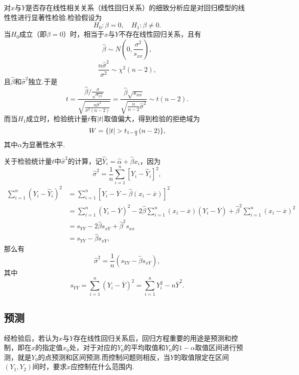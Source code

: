 对\(x\)与\(Y\)是否存在线性相关关系（线性回归关系）的细致分析应是对回归模型的线性性进行显著性检验.检验假设为\begin{equation*}
H_0: \beta = 0, \quad H_1: \beta \neq 0.
\end{equation*}当\(H_0\)成立（即\(\beta = 0\)）时，相当于\(x\)与\(Y\)不存在线性回归关系，且有\begin{equation*}
\hat{\beta} \sim N\left(0, \frac{\sigma^2}{s_{xx}}\right),
\end{equation*}\begin{equation*}
\frac{n \hat{\sigma}^2}{\sigma^2} \sim \chi^2(n-2),
\end{equation*}且\(\hat{\beta}\)和\(\hat{\sigma}^2\)独立.于是\begin{equation*}
t = \frac{\hat{\beta} / \frac{\sigma}{\sqrt{s_{xx}}}}{\sqrt{\frac{n\hat{\sigma}^2}{\sigma^2(n-2)}}}
= \frac{\hat{\beta} \sqrt{s_{xx}}}{\sqrt{\frac{n}{n-2} \hat{\sigma}^2}}
\sim t(n-2).
\end{equation*}而当\(H_1\)成立时，检验统计量\(t\)有\(\abs{t}\)取值偏大，得到检验的拒绝域为\begin{equation*}
W = \{ \abs{t} > t_{1-\frac{\alpha}{2}}(n-2) \},
\end{equation*}其中\(\alpha\)为显著性水平.

关于检验统计量\(t\)中\(\hat{\sigma}^2\)的计算，记\(\hat{Y}_i = \hat{\alpha}+\hat{\beta} x_i\)，因为\begin{equation*}
\hat{\sigma}^2 = \frac{1}{n} \sum_{i=1}^n[Y_i-\hat{Y}_i]^2,
\end{equation*}\begin{align*}
\sum_{i=1}^n(Y_i-\hat{Y}_i)^2
&= \sum_{i=1}^n[Y_i-\overline{Y}-\hat{\beta}(x_i-\overline{x})]^2 \\
&= \sum_{i=1}^n(Y_i-\overline{Y})^2
	-2\hat{\beta} \sum_{i=1}^n(x_i-\overline{x})(Y_i-\overline{Y})
	+\hat{\beta}^2 \sum_{i=1}^n(x_i-\overline{x})^2 \\
&= s_{YY} - 2 \hat{\beta} s_{xY} + \hat{\beta}^2 s_{xx} \\
&= s_{YY} - \hat{\beta} s_{xY},
\end{align*}那么有\begin{equation*}
\hat{\sigma}^2 = \frac{1}{n} (s_{YY} - \hat{\beta} s_{xY}),
\end{equation*}其中\begin{equation*}
s_{YY} = \sum_{i=1}^n(Y_i - \overline{Y})^2
= \sum_{i=1}^n{Y_i^2 - n\overline{Y}^2}.
\end{equation*}

\subsection{预测}
经检验后，若认为\(x\)与\(Y\)存在线性回归关系后，回归方程重要的用途是预测和控制，即在\(x\)的指定值\(x_0\)处，对于对应的\(Y_0\)的平均取值和\(Y_0\)的\(1-\alpha\)取值区间进行预测，就是\(Y_0\)的点预测和区间预测.而控制问题则相反，当\(Y\)的取值限定在区间\((Y_1,Y_2)\)间时，要求\(x\)应控制在什么范围内.

